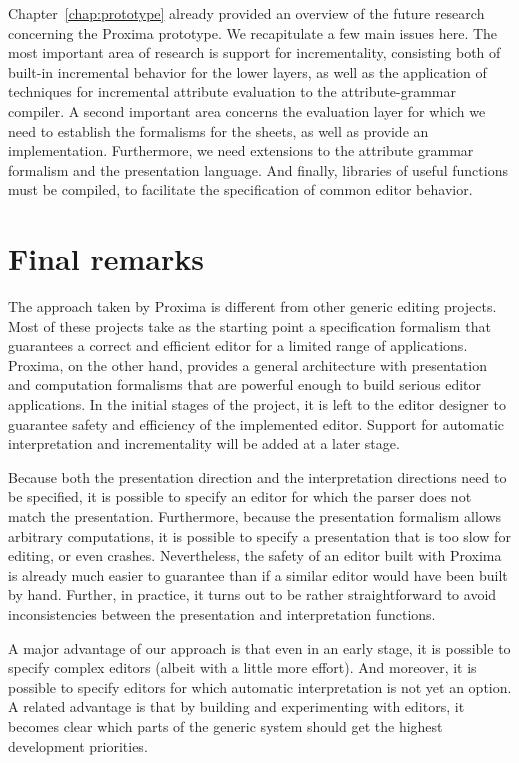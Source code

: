 Chapter~\ref{chap:prototype} already provided an overview of the future research concerning the Proxima prototype. We recapitulate a few main issues here. The most important area of research is support for incrementality, consisting both of built-in incremental behavior for the lower layers, as well as the application of techniques for incremental attribute evaluation to the attribute-grammar compiler. A second important area concerns the evaluation layer for which we need to establish the formalisms for the sheets, as well as provide an implementation. Furthermore, we need extensions to the attribute grammar formalism and the {\Xprez} presentation language.  And finally, libraries of useful functions must be compiled, to facilitate the specification of common editor behavior.

\section{Final remarks}

% 
The approach taken by Proxima is different from other generic editing projects. Most of these projects take as the starting point a specification formalism that guarantees a correct and efficient editor for a limited range of applications. Proxima, on the other hand, provides a general architecture with presentation and computation formalisms that are powerful enough to build serious editor applications. In the initial stages of the project, it is left to the editor designer to  guarantee safety and efficiency of the implemented editor. Support for automatic interpretation and incrementality  will be added at a later stage.

Because both the presentation direction and the interpretation directions need to be specified, it is possible to specify an editor for which the parser does not match the presentation. Furthermore, because the presentation formalism allows arbitrary computations, it is possible to specify a presentation that is too slow for editing, or even crashes.  Nevertheless, the safety of an editor built with Proxima is already much easier to guarantee than if a similar editor would have been built by hand. Further, in practice, it turns out to be rather straightforward to avoid inconsistencies between the presentation and interpretation functions.

A major advantage of our approach is that even in an early stage, it is possible to specify complex editors (albeit with a little more effort). And moreover, it is possible to specify editors for which automatic interpretation is not yet an option. A related advantage is that by building and experimenting with editors, it becomes clear which parts of the generic system should get the highest development priorities.

